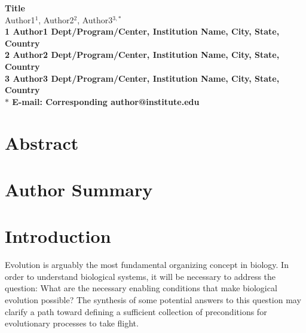 \documentclass[10pt]{article}
\date{}
\begin{document}
\begin{flushleft}
{\Large
\textbf{Title}
}
\\
Author1$^{1}$, 
Author2$^{2}$, 
Author3$^{3,\ast}$
\\
\bf{1} Author1 Dept/Program/Center, Institution Name, City, State, Country
\\
\bf{2} Author2 Dept/Program/Center, Institution Name, City, State, Country
\\
\bf{3} Author3 Dept/Program/Center, Institution Name, City, State, Country
\\
$\ast$ E-mail: Corresponding author@institute.edu
\end{flushleft}

\section*{Abstract}

\section*{Author Summary}

\section*{Introduction}
Evolution is arguably the most fundamental organizing concept in biology. In order to understand biological systems, it will be necessary to address the question: What are the necessary enabling conditions that make biological evolution possible? The synthesis of some potential answers to this question may clarify a path toward defining a sufficient collection of preconditions for evolutionary processes to take flight.
\end{document}
